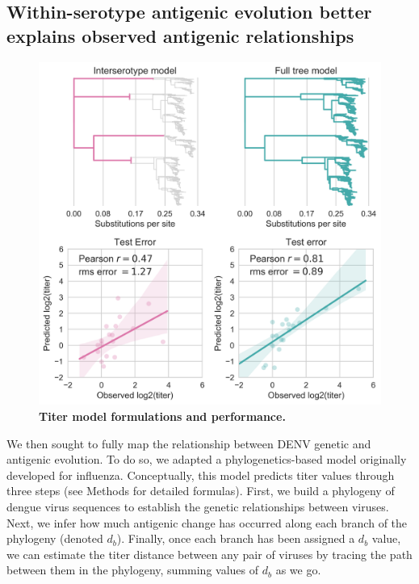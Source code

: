 \documentclass[11pt,oneside,letterpaper]{article}
\begin{document}
\subsection{Within-serotype antigenic evolution better explains observed antigenic relationships}
\begin{figure}[h]
  \begin{centering}
    \includegraphics[width=.8\textwidth]{../figures/png/titer_model_performance.png}
        \caption{\textbf{Titer model formulations and performance.}}
         \label{titer_model_performance}
  \end{centering}
\end{figure}

We then sought to fully map the relationship between DENV genetic and antigenic evolution.
To do so, we adapted a phylogenetics-based model originally developed for influenza. %
Conceptually, this model predicts titer values through three steps (see Methods for detailed formulas).
First, we build a phylogeny of dengue virus sequences to establish the genetic relationships between viruses.
Next, we infer how much antigenic change has occurred along each branch of the phylogeny (denoted $d_b$).
Finally, once each branch has been assigned a $d_b$ value, we can estimate the titer distance between any pair of viruses by tracing the path between them in the phylogeny, summing values of $d_b$ as we go.
\end{document}

